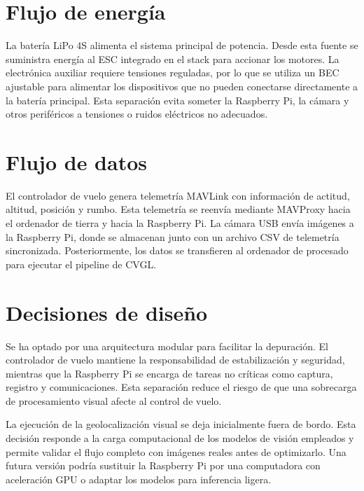 \section{Flujo de energía}
\label{sec:flujo-energia}

La batería LiPo 4S alimenta el sistema principal de potencia. Desde esta fuente se suministra energía al ESC integrado en el stack para accionar los motores. La electrónica auxiliar requiere tensiones reguladas, por lo que se utiliza un BEC ajustable para alimentar los dispositivos que no pueden conectarse directamente a la batería principal. Esta separación evita someter la Raspberry Pi, la cámara y otros periféricos a tensiones o ruidos eléctricos no adecuados.

\section{Flujo de datos}
\label{sec:flujo-datos}

El controlador de vuelo genera telemetría MAVLink con información de actitud, altitud, posición y rumbo. Esta telemetría se reenvía mediante MAVProxy hacia el ordenador de tierra y hacia la Raspberry Pi. La cámara USB envía imágenes a la Raspberry Pi, donde se almacenan junto con un archivo CSV de telemetría sincronizada. Posteriormente, los datos se transfieren al ordenador de procesado para ejecutar el pipeline de CVGL.

\section{Decisiones de diseño}
\label{sec:decisiones-diseno}

Se ha optado por una arquitectura modular para facilitar la depuración. El controlador de vuelo mantiene la responsabilidad de estabilización y seguridad, mientras que la Raspberry Pi se encarga de tareas no críticas como captura, registro y comunicaciones. Esta separación reduce el riesgo de que una sobrecarga de procesamiento visual afecte al control de vuelo.

La ejecución de la geolocalización visual se deja inicialmente fuera de bordo. Esta decisión responde a la carga computacional de los modelos de visión empleados y permite validar el flujo completo con imágenes reales antes de optimizarlo. Una futura versión podría sustituir la Raspberry Pi por una computadora con aceleración GPU o adaptar los modelos para inferencia ligera.

